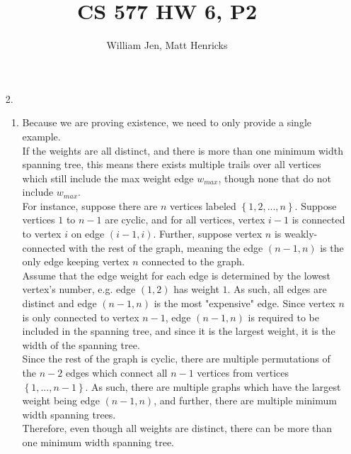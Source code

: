 \documentclass{article}
\title{CS 577 HW 6, P2}
\author{William Jen, Matt Henricks}
\date{}
\begin{document}
\maketitle

\begin{enumerate}
    \item[2.]
        \begin{enumerate}
            \item Because we are proving existence, we need to only provide a single example. \\
            
            If the weights are all distinct, and there is more than one minimum width spanning tree, this means there exists multiple trails over all vertices which still include the max weight edge $w_{max}$, though none that do not include $w_{max}$.\\
            
            For instance, suppose there are $n$ vertices labeled $\left\{1, 2, ..., n\right\}$. Suppose vertices $1$ to $n - 1$ are cyclic, and for all vertices, vertex $i - 1$ is connected to vertex $i$ on edge $(i - 1, i)$. Further, suppose vertex $n$ is weakly-connected with the rest of the graph, meaning the edge $(n - 1, n)$ is the only edge keeping vertex $n$ connected to the graph.\\
            
            Assume that the edge weight for each edge is determined by the lowest vertex's number, e.g. edge $(1, 2)$ has weight $1$. As such, all edges are distinct and edge $(n - 1, n)$ is the most "expensive" edge. Since vertex $n$ is only connected to vertex $n - 1$, edge $(n - 1, n)$ is required to be included in the spanning tree, and since it is the largest weight, it is the width of the spanning tree.\\
            
            Since the rest of the graph is cyclic, there are multiple permutations of the $n - 2$ edges which connect all $n - 1$ vertices from vertices $\left\{1, ..., n - 1\right\}$. As such, there are multiple graphs which have the largest weight being edge $(n - 1, n)$, and further, there are multiple minimum width spanning trees.\\
            
            Therefore, even though all weights are distinct, there can be more than one minimum width spanning tree.\\
            

\end{enumerate}
\end{enumerate}
\end{document}
